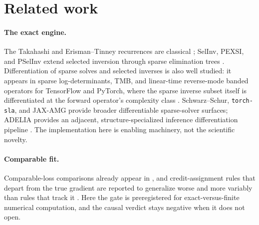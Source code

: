 \section{Related work}
\label{sec:related}

\paragraph{The exact engine.}
The Takahashi and Erisman--Tinney recurrences are classical
\citep{takahashi1973,erismantinney1975}; SelInv, PEXSI, and PSelInv extend
selected inversion through sparse elimination trees
\citep{lin2011selinv,lin2013pexsi,jacquelin2018pselinv}. Differentiation of
sparse solves and selected inverses is also well studied: it appears in sparse
log-determinants, TMB, and linear-time
reverse-mode banded operators for TensorFlow and PyTorch, where the sparse
inverse subset itself is differentiated at the forward operator's complexity
class \citep{zhu2019sparse,kristensen2016tmb,durrande2019banded}. Schwarz--Schur,
\texttt{torch-sla}, and JAX-AMG provide broader differentiable sparse-solver
surfaces; ADELIA provides an adjacent, structure-specialized inference
differentiation pipeline
\citep{wang2025schwarz,torchsla2026,boudaoud2026adelia,liu2026jaxamg}. The
implementation here is enabling machinery, not the scientific novelty.

\paragraph{Comparable fit.}
Comparable-loss comparisons already appear in
\citet{mueller2025trajectories,boursier2025simplicity}, and credit-assignment
rules that depart from the true gradient are reported to generalize worse and
more variably than rules that track it \citep{liu2022generalization}. Here the
gate is preregistered for exact-versus-finite numerical computation, and the causal
verdict stays negative when it does not open.

